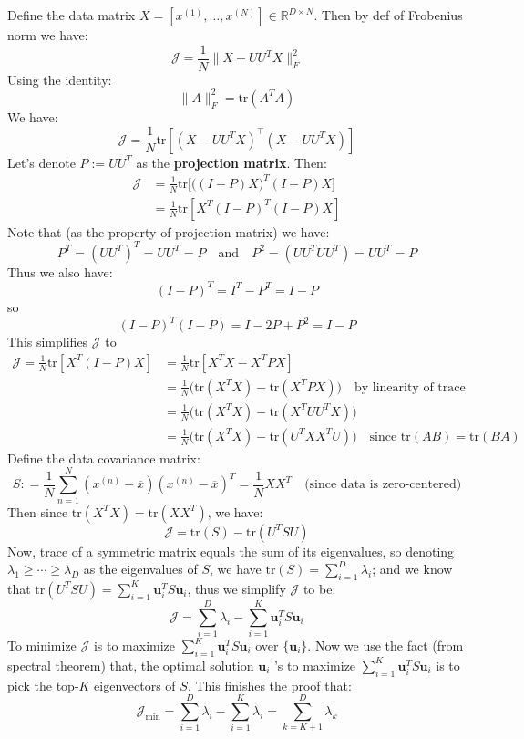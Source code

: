 \documentclass[lang=cn,11pt]{elegantbook}
\begin{document}
Define the data matrix \(X = [x^{(1)}, \dots, x^{(N)}] \in \mathbb{R}^{D \times N}\). Then by def of Frobenius norm we have:  
\[
\mathcal{J} = \frac{1}{N} \|X - UU^T X\|_F^2
\]
Using the identity:  
\[
\|A\|_F^2 = \text{tr}(A^T A)
\]
We have:  
\[
\mathcal{J} = \frac{1}{N} \text{tr} \left[ (X - UU^T X)^\top (X - UU^T X) \right]
\]
Let’s denote \(P := UU^T\) as the \textbf{projection matrix}. Then:
\begin{align}
    \mathcal{J} &=  \frac{1}{N} \text{tr} \bigg[ \big((I - P) X\big)^T  (I - P)  X\bigg]  \\
   &=  \frac{1}{N} \text{tr} \left[X^T  (I - P)^T  (I - P) X\right]
\end{align}
Note that (as the property of projection matrix) we have:  
\[
P^T = (UU^T)^T =  UU^T =  P \quad \text{and}\quad P^2 = (UU^T UU^T) = UU^T = P
\]
Thus we also have: 
$$
(I - P)^T = I^T - P^T  = I-P
$$
so 
$$
 (I - P)^T  (I - P)  = I - 2P + P^2 = I - P
$$
This simplifies $\mathcal{J}$ to 
\begin{align*}
    \mathcal{J} = \frac{1}{N} \text{tr} \left[X^T  (I - P) X\right] &= \frac{1}{N} \text{tr} \left[X^TX - X^T P X\right] \\
    & =  \frac{1}{N} \bigg( \text{tr} (X^TX)  - \text{tr}(X^T P X) \bigg)   \quad 
    \text{by linearity of trace}\\
    & = \frac{1}{N} \bigg( \text{tr} (X^TX)  - \text{tr}(X^T UU^T X) \bigg) \\
    & = \frac{1}{N} \bigg( \text{tr} (X^TX)  - \text{tr}(U^T XX^T U) \bigg) \quad \text{since tr}(AB) = \text{tr}(BA)
    \end{align*}
Define the data covariance matrix: \[
S : =\frac{1}{N} \sum_{n=1}^N\left({x}^{(n)}-\overline{{x}}\right)\left({x}^{(n)}-\overline{{x}}\right)^T = \frac{1}{N}XX^T \quad \text{(since data is zero-centered)}
\]Then since $\text{tr}(X^TX) = \text{tr}(XX^T) $, we have: \[
\mathcal{J} =   \text{tr} (S)  - \text{tr}(U^T S U) 
\]
Now, trace of a symmetric matrix equals the sum of its eigenvalues, so denoting $\lambda_1 \geq \cdots \geq \lambda_D$ as the eigenvalues of $S$, we have $\text{tr} (S) = \sum_{i=1}^D \lambda_i$; and we know that $\text{tr}(U^T S U)  =\sum_{i=1}^K \mathbf{u}_i^TS \mathbf{u}_i $, thus we simplify $\mathcal{J}$ to be:
\[
 \mathcal{J} = \sum_{i=1}^D \lambda_i - \sum_{i=1}^K \mathbf{u}_i^T  S \mathbf{u}_i 
\]
To minimize \(\mathcal{J}\) is to maximize \(\sum_{i=1}^K \mathbf{u}_i^T S \mathbf{u}_i\) over \(\{\mathbf{u}_i\}\). 
Now we use the fact (from spectral theorem) that, the optimal solution $\mathbf{u}_i$ 's to maximize \(\sum_{i=1}^K \mathbf{u}_i^T S \mathbf{u}_i\) is to pick the top-$K$ eigenvectors of $S$. 
This finishes the proof that: \[
\mathcal{J}_{\min} = \sum_{i=1}^D \lambda_i - \sum_{i=1}^K \lambda_i = \sum_{k=K+1}^D \lambda_k 
\]
\end{document}

